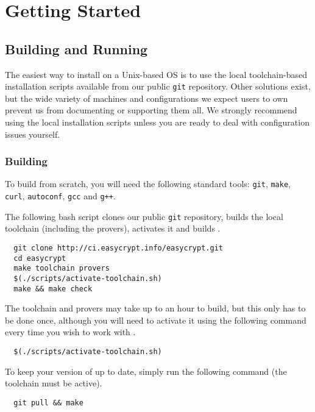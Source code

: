 
\chapter{Getting Started}
\section{Building and Running \EasyCrypt}
The easiest way to install \EasyCrypt on a Unix-based OS is to use the local
toolchain-based installation scripts available from our public \texttt{git}
repository. Other solutions exist, but the wide variety of machines and
configurations we expect \EasyCrypt users to own prevent us from documenting or
supporting them all. We strongly recommend using the local installation scripts
unless you are ready to deal with configuration issues yourself.

\subsection{Building \EasyCrypt}
To build \EasyCrypt from scratch, you will need the following standard tools:
\texttt{git}, \texttt{make}, \texttt{curl}, \texttt{autoconf}, \texttt{gcc} and \texttt{g++}.

The following bash script clones our public \texttt{git} repository, builds the
local toolchain (including the provers), activates it and builds \EasyCrypt.

\begin{verbatim}
  git clone http://ci.easycrypt.info/easycrypt.git 
  cd easycrypt
  make toolchain provers
  $(./scripts/activate-toolchain.sh)
  make && make check
\end{verbatim}

The toolchain and provers may take up to an hour to build, but this only has to
be done once, although you will need to activate it using the following command
every time you wish to work with \EasyCrypt.

\begin{verbatim}
  $(./scripts/activate-toolchain.sh)
\end{verbatim}

To keep your version of \EasyCrypt up to date, simply run the following command
(the toolchain must be active).

\begin{verbatim}
  git pull && make
\end{verbatim}

